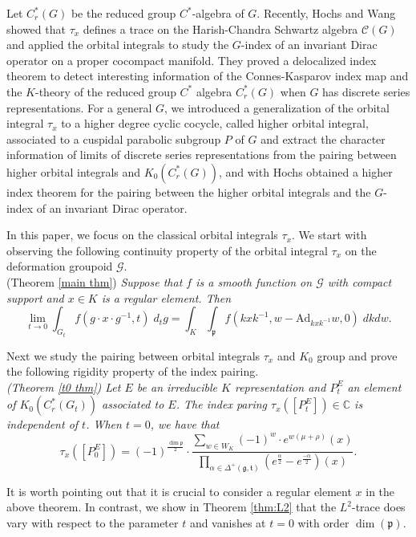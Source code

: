\documentclass{amsproc}
\theoremstyle{definition}
\theoremstyle{remark}
\numberwithin{equation}{section}
\newcommand{\kg}{\mathfrak{g}}
\newcommand{\kp}{\mathfrak{p}}
\newcommand{\kt}{\mathfrak{t}}
\begin{document}
Let $C^*_r(G)$ be the reduced group $C^*$-algebra of $G$. Recently, Hochs and Wang \cite{HW} showed that $\tau_x$ defines a trace on the Harish-Chandra Schwartz algebra $\mathcal{C}(G)$ and applied the orbital integrals to study the $G$-index of an invariant Dirac operator on a proper cocompact manifold. They proved a delocalized index theorem to detect interesting information of the Connes-Kasparov index map and the $K$-theory of the reduced group $C^*$ algebra $C^*_r(G)$ when $G$ has discrete series representations. For a general $G$, we \cite{ST1} introduced a generalization of the orbital integral $\tau_x$ to a higher degree cyclic cocycle, called higher orbital integral, associated to a cuspidal parabolic subgroup $P$ of $G$ and extract the character information of limits of discrete series representations from the pairing between higher orbital integrals and $K_0(C^*_r(G))$, and with Hochs \cite{HST} obtained a higher index theorem for the pairing between the higher orbital integrals and the $G$-index of an invariant Dirac operator. 

In this paper, we focus on the classical orbital integrals $\tau_x$. We start with observing  the following continuity property of the orbital integral $\tau_x$ on the deformation groupoid $\mathcal{G}$.\\

 (Theorem \ref{main thm})
{\em Suppose that $f$ is a smooth  function on $\mathcal{G}$ with compact support and $x \in K$ is a regular element.  Then 
\[
\lim_{t \to 0} \int_{G_t} f(g \cdot x \cdot  g^{-1}, t) \; d_t g = \int_K  \int_\kp f\left(kx k^{-1}, w-\text{Ad}_{kx k^{-1}}   w , 0\right ) \; dk dw .
\]}

Next we study the pairing between orbital integrals $\tau_x$ and $K_0$ group and prove the following rigidity property of the index pairing.\\

 {\em (Theorem \ref{t0 thm}) Let $E$ be an irreducible $K$ representation and  $P^E_t$ an element of $K_0(C^*_r(G_t))$ associated to $E$. The index paring 
$\tau_x \left([P^E_t]\right)  \in \mathbb{C}$ is independent of $t$. When $t = 0$, we have that 
\[
\tau_x \left([P^E_0]\right)  = (-1)^{\frac{\dim \kp}{2}} \cdot \frac{\sum_{w \in W_K} (-1)^w \cdot e^{w(\mu + \rho)}(x)}{\prod_{\alpha \in \Delta^+(\kg, \kt)}\left( e^{\frac{\alpha}{2}} - e^{\frac{-\alpha}{2}} \right)(x)}.
\]	
}

It is worth pointing out that it is crucial to consider a regular element $x$ in the above theorem. In contrast, we show in Theorem \ref{thm:L2}  that the $L^2$-trace does vary with respect to the parameter $t$ and vanishes at $t=0$ with order $\dim(\mathfrak{p})$.
\end{document}
